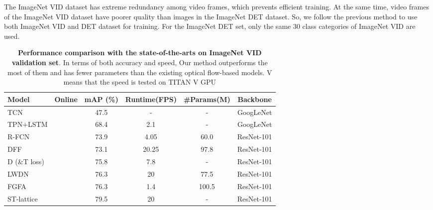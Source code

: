 \documentclass[runningheads]{llncs}
\newcommand{\cmark}{\ding{51}}\newcommand{\xmark}{\ding{55}}
\begin{document}
The ImageNet VID dataset has extreme redundancy among video frames, which prevents efficient training. At the same time, video frames of the ImageNet VID dataset have poorer quality than images in the ImageNet DET \cite{russakovsky2015imagenet} dataset. So, we follow the previous method \cite{zhu2018towards} to use both ImageNet VID and DET dataset for training. For the ImageNet DET set, only the same 30 class categories of ImageNet VID are used.

\begin{table}[t]\centering
\caption{
\textbf{Performance comparison with the state-of-the-arts on ImageNet VID validation set}. 
In terms of both accuracy and speed, 
Our method outperforms the most of them and has fewer parameters than the existing optical flow-based models. V means that the speed is tested on TITAN V GPU
}
\begin{tabular}{lccccc}
\toprule
Model   & Online &  mAP (\%) & Runtime(FPS)  & \#Params(M)  & Backbone \\
\midrule
TCN\cite{kang2016object}                                        &     \xmark       & 47.5             & -                  &-   &  GoogLeNet                          \\
TPN+LSTM\cite{kang2017object}                                          &     \xmark       & 68.4             & 2.1                &-     &  GoogLeNet                 \\
R-FCN \cite{dai2016r}                                             &     \cmark       & 73.9             & 4.05                &60.0 & ResNet-101             \\
DFF \cite{zhu2017deep}                                             &     \cmark       & 73.1             & 20.25               &97.8   & ResNet-101           \\
D (\&T loss) \cite{feichtenhofer2017detect}                          &     \cmark & 75.8             & 7.8                &-     & ResNet-101          \\
LWDN \cite{Jiang2019VideoOD}                                     & \cmark        & 76.3             & 20                &77.5    & ResNet-101    \\
FGFA \cite{zhu2017flow}                                            &     \xmark  & 76.3             & 1.4                &100.5  & ResNet-101           \\
ST-lattice \cite{chen2018optimizing}                               &     \xmark  & 79.5             & 20                  &-    & ResNet-101             \\

\end{tabular}
\end{table}
\end{document}
